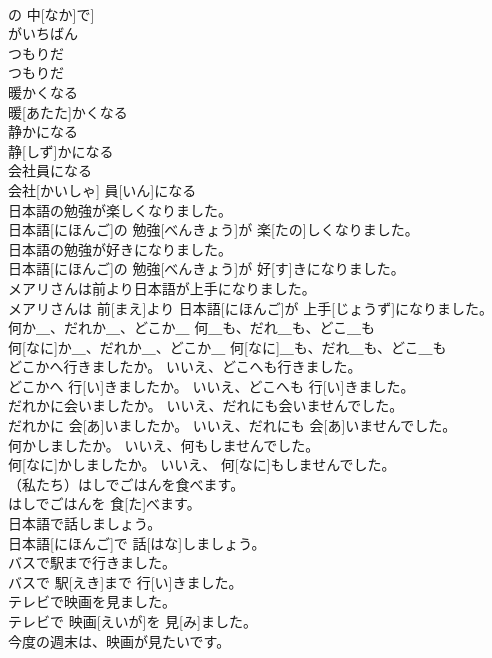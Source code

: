 \documentclass[8pt]{extreport}
\begin{document}
\begin{CJK}{UTF8}{min}
\\	の 中[なか]で] 
\\	がいちばん
\\	つもりだ	
\\	[たす]つもりだ	
\\	暖かくなる	
\\	暖[あたた]かくなる	
\\	静かになる	
\\	静[しず]かになる	
\\	会社員になる	
\\	会社[かいしゃ] 員[いん]になる	
\\	日本語の勉強が楽しくなりました。	
\\	日本語[にほんご]の 勉強[べんきょう]が 楽[たの]しくなりました。	
\\	日本語の勉強が好きになりました。	
\\	日本語[にほんご]の 勉強[べんきょう]が 好[す]きになりました。	
\\	メアリさんは前より日本語が上手になりました。	
\\	メアリさんは 前[まえ]より 日本語[にほんご]が 上手[じょうず]になりました。	
\\	何か＿、だれか＿、どこか＿ 何＿も、だれ＿も、どこ＿も	
\\	何[なに]か＿、だれか＿、どこか＿ 何[なに]＿も、だれ＿も、どこ＿も	
\\	どこかへ行きましたか。 いいえ、どこへも行きました。	
\\	どこかへ 行[い]きましたか。 いいえ、どこへも 行[い]きました。	
\\	だれかに会いましたか。 いいえ、だれにも会いませんでした。	
\\	だれかに 会[あ]いましたか。 いいえ、だれにも 会[あ]いませんでした。	
\\	何かしましたか。 いいえ、何もしませんでした。	
\\	何[なに]かしましたか。 いいえ、 何[なに]もしませんでした。	
\\	（私たち）はしでごはんを食べます。	
\\	はしでごはんを 食[た]べます。	
\\	日本語で話しましょう。	
\\	日本語[にほんご]で 話[はな]しましょう。	
\\	バスで駅まで行きました。	
\\	バスで 駅[えき]まで 行[い]きました。	
\\	テレビで映画を見ました。	
\\	テレビで 映画[えいが]を 見[み]ました。	
\\	今度の週末は、映画が見たいです。	

\end{CJK}
\end{document}
